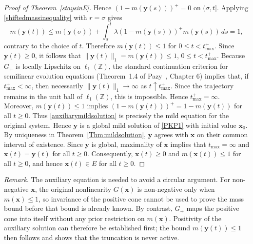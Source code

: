 \documentclass[12pt]{article}
\newcommand{\Z}{\ensuremath{\mathbb Z}}
\newcommand{\by}{\boldsymbol{y}}
\newcommand{\BS}{\ensuremath{\ell_1(\Z)}}
\newcommand{\bx}{\boldsymbol{x}}
\begin{document}
\begin{proof}[Proof of Theorem~\ref{staysinE}]
Hence $(1-m(\by(s)))^+=0$ on $(\sigma,t]$.
Applying \eqref{shiftedmassinequality} with $r=\sigma$ gives
$$
m(\by(t))
\leq m(\by(\sigma))
+\int_\sigma^t
\lambda(1-m(\by(s)))^+m(\by(s))\,ds
=1,
$$
contrary to the choice of $t$. Therefore
$m(\by(t))\leq 1$ for $0\leq t<t_{\max}^+$.
Since $\by(t)\geq 0$, it follows that $\|\by(t)\|_1=m(\by(t))\leq 1$,
$0\leq t<t_{\max}^+$. Because $G_+$ is locally Lipschitz on
$\BS$, the standard continuation criterion for semilinear
evolution equations (Theorem~1.4 of Pazy~\cite{Paz83}, Chapter 6) implies 
that, if $t_{\max}^+<\infty$, then
necessarily $\|\by(t)\|_1 \to \infty$ as $t\uparrow t_{\max}^+$.
Since the trajectory remains in the unit ball of
$\BS$, this is impossible. Hence $t_{\max}^+=\infty$.
Moreover, $m(\by(t))\leq 1$ implies
$(1-m(\by(t)))^+=1-m(\by(t))$ for all $t\geq 0$. Thus
\eqref{auxiliarymildsolution} is precisely the mild equation for the
original system. Hence $\by$ is a global mild solution of
\eqref{PKP1} with initial value $\bx_0$.
By uniqueness in Theorem~\ref{Thm:mildsolution}, $\by$ agrees with
$\bx$ on their common interval of existence. Since $\by$ is global,
maximality of $\bx$ implies that $t_{\max}=\infty$ and
$\bx(t)=\by(t)$ for all $t\geq 0$. Consequently,
$\bx(t)\geq 0$ and $m(\bx(t))\leq 1$ for all $t\geq 0$, and hence
$\bx(t)\in E$ for all $t\geq 0$.
\end{proof}

\noindent
\emph{Remark}.
The auxiliary equation is needed to avoid a circular argument. For
non-negative $\bx$, the original nonlinearity $G(\bx)$ is non-negative
only when $m(\bx)\leq 1$, so invariance of the positive cone cannot be
used to prove the mass bound before that bound is already known. By
contrast, $G_+$ maps the positive cone into itself without any prior
restriction on $m(\bx)$. Positivity of the auxiliary solution can
therefore be established first; the bound $m(\by(t))\leq 1$ then follows
and shows that the truncation is never active.
\end{document}
